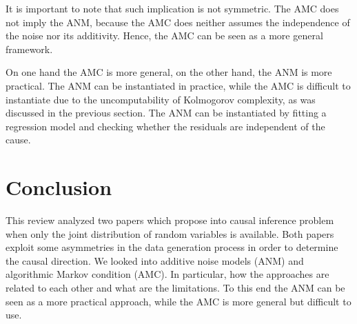 \documentclass{article}
\begin{document}
It is important to note that such implication is not symmetric. The AMC does not imply the ANM, because the AMC does neither assumes the independence of the noise nor its additivity. Hence, the AMC can be seen as a more general framework. 

On one hand the AMC is more general, on the other hand, the ANM is more practical. The ANM can be instantiated in practice, while the AMC is difficult to instantiate due to the uncomputability of Kolmogorov complexity, as was discussed in the previous section. The ANM can be instantiated by fitting a regression model and checking whether the residuals are independent of the cause. 

\section{Conclusion}

This review analyzed two papers which propose into causal inference problem when only the joint distribution of random variables is available. Both papers exploit some asymmetries in the data generation process in order to determine the causal direction. We looked into additive noise models (ANM) and algorithmic Markov condition (AMC). In particular, how the approaches are related to each other and what are the limitations. To this end the ANM can be seen as a more practical approach, while the AMC is more general but difficult to use. 

	

\end{document}
